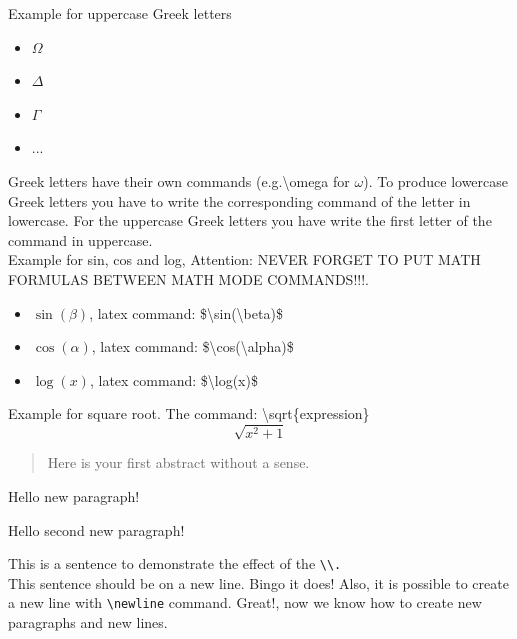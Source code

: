    Example for uppercase Greek letters
    \begin{itemize}
        \item $\Omega$
        \item $\Delta$
        \item $\Gamma$
        \item ...
    \end{itemize}
    Greek letters have their own commands (e.g.\textbackslash omega for $\omega$). To produce lowercase Greek
    letters you have to write the corresponding command of the letter in 
    lowercase. For the uppercase Greek letters you have write the first
    letter of the command in uppercase.\\

    Example for sin, cos and log, Attention: NEVER FORGET TO PUT MATH FORMULAS
    BETWEEN MATH MODE COMMANDS!!!.
    \begin{itemize}
        \item $\sin(\beta)$, latex command:  \$\textbackslash sin(\textbackslash beta)\$ 
        \item $\cos(\alpha)$, latex command:  \$\textbackslash cos(\textbackslash alpha)\$ 
        \item $\log(x)$, latex command:  \$\textbackslash log(x)\$ 
    \end{itemize}

    Example for square root. The command: \textbackslash sqrt\{expression\}
    \[\sqrt{x^2+1}\]

    \begin{abstract}
        Here is your first abstract without a sense.
    \end{abstract}

    Hello new paragraph! 
    
    Hello second new paragraph!

    This is a sentence to demonstrate the effect of the \verb|\\.|\\
    This sentence should be on a new line. Bingo it does!
    Also, it is possible to create a new line with \verb|\newline|\newline
    command. Great!, now we know how to create new paragraphs and new lines.

